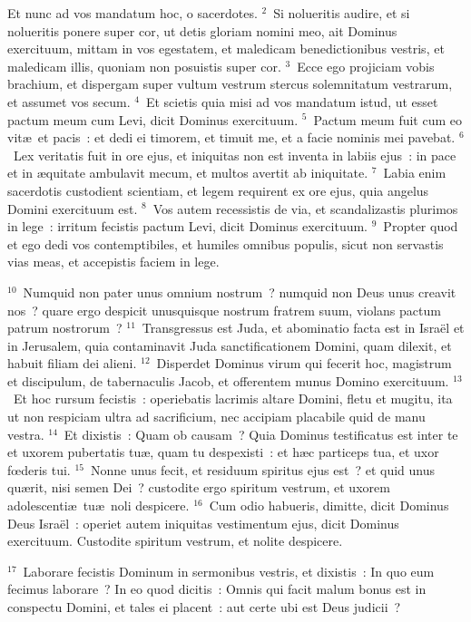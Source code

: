 \lettrine[lines=3,image=true,loversize=0.05,lraise=-0.03]{E}{}t nunc ad vos mandatum hoc, o sacerdotes.
${}^{2}$~Si nolueritis audire, et si nolueritis ponere super cor, ut detis gloriam nomini meo, ait Dominus exercituum, mittam in vos egestatem, et maledicam benedictionibus vestris, et maledicam illis, quoniam non posuistis super cor.
${}^{3}$~Ecce ego projiciam vobis brachium, et dispergam super vultum vestrum stercus solemnitatum vestrarum, et assumet vos secum.
${}^{4}$~Et scietis quia misi ad vos mandatum istud, ut esset pactum meum cum Levi, dicit Dominus exercituum.
${}^{5}$~Pactum meum fuit cum eo vit\ae\ et pacis~: et dedi ei timorem, et timuit me, et a facie nominis mei pavebat.
${}^{6}$~Lex veritatis fuit in ore ejus, et iniquitas non est inventa in labiis ejus~: in pace et in \ae quitate ambulavit mecum, et multos avertit ab iniquitate.
${}^{7}$~Labia enim sacerdotis custodient scientiam, et legem requirent ex ore ejus, quia angelus Domini exercituum est.
${}^{8}$~Vos autem recessistis de via, et scandalizastis plurimos in lege~: irritum fecistis pactum Levi, dicit Dominus exercituum.
${}^{9}$~Propter quod et ego dedi vos contemptibiles, et humiles omnibus populis, sicut non servastis vias meas, et accepistis faciem in lege.


${}^{10}$~Numquid non pater unus omnium nostrum~? numquid non Deus unus creavit nos~? quare ergo despicit unusquisque nostrum fratrem suum, violans pactum patrum nostrorum~?
${}^{11}$~Transgressus est Juda, et abominatio facta est in Isra\"el et in Jerusalem, quia contaminavit Juda sanctificationem Domini, quam dilexit, et habuit filiam dei alieni.
${}^{12}$~Disperdet Dominus virum qui fecerit hoc, magistrum et discipulum, de tabernaculis Jacob, et offerentem munus Domino exercituum.
${}^{13}$~Et hoc rursum fecistis~: operiebatis lacrimis altare Domini, fletu et mugitu, ita ut non respiciam ultra ad sacrificium, nec accipiam placabile quid de manu vestra.
${}^{14}$~Et dixistis~: Quam ob causam~? Quia Dominus testificatus est inter te et uxorem pubertatis tu\ae , quam tu despexisti~: et h\ae c particeps tua, et uxor fœderis tui.
${}^{15}$~Nonne unus fecit, et residuum spiritus ejus est~? et quid unus qu\ae rit, nisi semen Dei~? custodite ergo spiritum vestrum, et uxorem adolescenti\ae\ tu\ae\ noli despicere.
${}^{16}$~Cum odio habueris, dimitte, dicit Dominus Deus Isra\"el~: operiet autem iniquitas vestimentum ejus, dicit Dominus exercituum. Custodite spiritum vestrum, et nolite despicere.


${}^{17}$~Laborare fecistis Dominum in sermonibus vestris, et dixistis~: In quo eum fecimus laborare~? In eo quod dicitis~: Omnis qui facit malum bonus est in conspectu Domini, et tales ei placent~: aut certe ubi est Deus judicii~?

